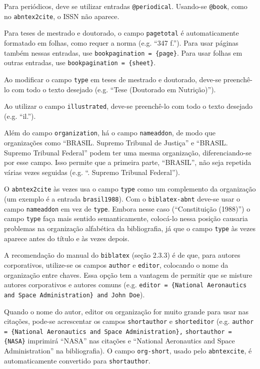 \documentclass[a4paper]{article}
\begin{document}
\begin{itemize}
\begin{sloppypar}
    \item Para periódicos, deve se utilizar entradas \texttt{@periodical}. Usando-se \texttt{@book}, como no \texttt{abntex2cite}, o ISSN não aparece.
    \item Para teses de mestrado e doutorado, o campo \texttt{pagetotal} é automaticamente formatado em folhas, como requer a norma (e.g. ``347 f.''). Para usar páginas também nessas entradas, use \texttt{bookpagination = \{page\}}. Para usar folhas em outras entradas, use \texttt{bookpagination = \{sheet\}}.
    \item Ao modificar o campo \texttt{type} em teses de mestrado e doutorado, deve-se preenchê-lo com todo o texto desejado (e.g. ``Tese (Doutorado em Nutrição)'').
    \item Ao utilizar o campo \texttt{illustrated}, deve-se preenchê-lo com todo o texto desejado (e.g. ``il.'').
    \item Além do campo \texttt{organization}, há o campo \texttt{nameaddon}, de modo que organizações como ``BRASIL. Supremo Tribunal de Justiça'' e ``BRASIL. Supremo Tribunal Federal'' podem ter uma mesma organização, diferenciando-se por esse campo. Isso permite que a primeira parte, ``BRASIL'', não seja repetida várias vezes seguidas (e.g. ``\underline{\hspace*{4em}}. Supremo Tribunal Federal'').
    \item O \texttt{abntex2cite} às vezes usa o campo \texttt{type} como um complemento da organização (um exemplo é a entrada \texttt{brasil1988}). Com o \texttt{biblatex-abnt} deve-se usar o campo \texttt{nameaddon} em vez de \texttt{type}. Embora nesse caso (``Constituição (1988)'') o campo \texttt{type} faça mais sentido semanticamente, colocá-lo nessa posição causaria problemas na organização alfabética da bibliografia, já que o campo \texttt{type} às vezes aparece antes do título e às vezes depois.
    \item A recomendação do manual do \texttt{biblatex} (seção 2.3.3) é de que, para autores corporativos, utilize-se os campos \texttt{author} e \texttt{editor}, colocando o nome da organização entre chaves. Essa opção tem a vantagem de permitir que se misture autores corporativos e autores comuns (e.g. \texttt{editor = \{National Aeronautics and Space Administration\} and John Doe}).
    \item Quando o nome do autor, editor ou organização for muito grande para usar nas citações, pode-se acrescentar os campos \texttt{short\-author} e \texttt{short\-editor} (e.g. \texttt{author = \{National Aeronautics and Space Ad\-min\-is\-tra\-tion\},} \texttt{short\-author = \{NASA\}} imprimirá ``NASA'' nas citações e ``National Aeronautics and Space Administration'' na bibliografia). O campo \texttt{org-short}, usado pelo \texttt{abntex\-cite}, é automaticamente convertido para \texttt{shortauthor}.

\end{sloppypar}
\end{itemize}
\end{document}
